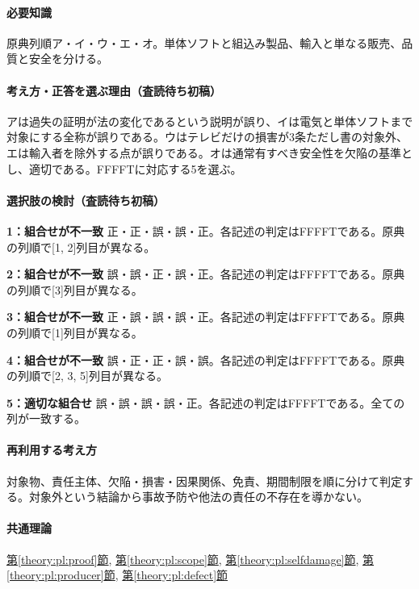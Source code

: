 \paragraph{必要知識} 原典列順ア・イ・ウ・エ・オ。単体ソフトと組込み製品、輸入と単なる販売、品質と安全を分ける。

\paragraph{考え方・正答を選ぶ理由（査読待ち初稿）} アは過失の証明が法の変化であるという説明が誤り、イは電気と単体ソフトまで対象にする全称が誤りである。ウはテレビだけの損害が3条ただし書の対象外、エは輸入者を除外する点が誤りである。オは通常有すべき安全性を欠陥の基準とし、適切である。FFFFTに対応する5を選ぶ。

\paragraph{選択肢の検討（査読待ち初稿）}\mbox{}\par

\noindent\textbf{1：組合せが不一致} 正・正・誤・誤・正。各記述の判定はFFFFTである。原典の列順で[1, 2]列目が異なる。\par

\noindent\textbf{2：組合せが不一致} 誤・誤・正・誤・正。各記述の判定はFFFFTである。原典の列順で[3]列目が異なる。\par

\noindent\textbf{3：組合せが不一致} 正・誤・誤・誤・正。各記述の判定はFFFFTである。原典の列順で[1]列目が異なる。\par

\noindent\textbf{4：組合せが不一致} 誤・正・正・誤・誤。各記述の判定はFFFFTである。原典の列順で[2, 3, 5]列目が異なる。\par

\noindent\textbf{5：適切な組合せ} 誤・誤・誤・誤・正。各記述の判定はFFFFTである。全ての列が一致する。\par

\paragraph{再利用する考え方} 対象物、責任主体、欠陥・損害・因果関係、免責、期間制限を順に分けて判定する。対象外という結論から事故予防や他法の責任の不存在を導かない。

\paragraph{共通理論} \hyperref[theory:pl:proof]{第\ref*{theory:pl:proof}節}, \hyperref[theory:pl:scope]{第\ref*{theory:pl:scope}節}, \hyperref[theory:pl:selfdamage]{第\ref*{theory:pl:selfdamage}節}, \hyperref[theory:pl:producer]{第\ref*{theory:pl:producer}節}, \hyperref[theory:pl:defect]{第\ref*{theory:pl:defect}節}

